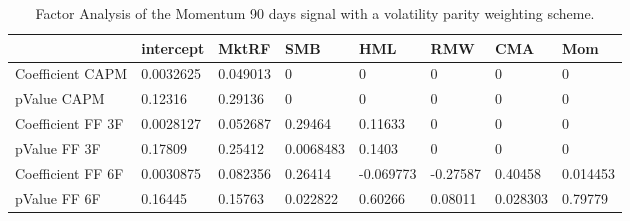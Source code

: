 \begin{table}[H]
\centering
\begin{tabular}{llllllll}
\hline& intercept & MktRF & SMB & HML & RMW & CMA & Mom \\ 
\hline 
Coefficient CAPM & 0.0032625 & 0.049013 & 0 & 0 & 0 & 0 & 0 \\ 
pValue CAPM & 0.12316 & 0.29136 & 0 & 0 & 0 & 0 & 0 \\ 
Coefficient FF 3F & 0.0028127 & 0.052687 & 0.29464 & 0.11633 & 0 & 0 & 0 \\ 
pValue FF 3F & 0.17809 & 0.25412 & 0.0068483 & 0.1403 & 0 & 0 & 0 \\ 
Coefficient FF 6F & 0.0030875 & 0.082356 & 0.26414 & -0.069773 & -0.27587 & 0.40458 & 0.014453 \\ 
pValue FF 6F & 0.16445 & 0.15763 & 0.022822 & 0.60266 & 0.08011 & 0.028303 & 0.79779 \\ 
\hline
\end{tabular}
\caption{Factor Analysis of the Momentum 90 days signal with a volatility parity weighting scheme.}
\label{MOM90VP_FACTOR}
\end{table}